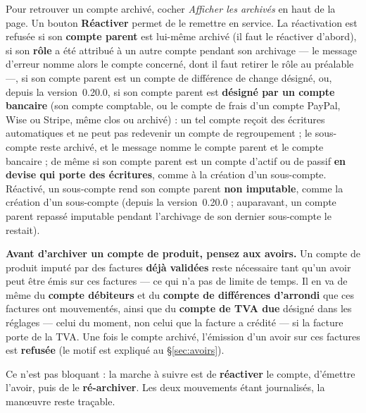 \documentclass[a4paper,11pt,oneside]{article}
\begin{document}
Pour retrouver un compte archivé, cocher \emph{Afficher les archivés} en haut de la page. Un bouton \textbf{Réactiver} permet de le remettre en service. La réactivation est refusée si son \textbf{compte parent} est lui-même archivé (il faut le réactiver d'abord), si son \textbf{rôle} a été attribué à un autre compte pendant son archivage — le message d'erreur nomme alors le compte concerné, dont il faut retirer le rôle au préalable —, si son compte parent est un compte de différence de change désigné, ou, depuis la version~0.20.0, si son compte parent est \textbf{désigné par un compte bancaire} (son compte comptable, ou le compte de frais d'un compte PayPal, Wise ou Stripe, même clos ou archivé) : un tel compte reçoit des écritures automatiques et ne peut pas redevenir un compte de regroupement ; le sous-compte reste archivé, et le message nomme le compte parent et le compte bancaire ; de même si son compte parent est un compte d'actif ou de passif \textbf{en devise qui porte des écritures}, comme à la création d'un sous-compte. Réactivé, un sous-compte rend son compte parent \textbf{non imputable}, comme la création d'un sous-compte (depuis la version~0.20.0 ; auparavant, un compte parent repassé imputable pendant l'archivage de son dernier sous-compte le restait).

\label{sec:plan-comptable-archivage}

\begin{keshwarning}
\textbf{Avant d'archiver un compte de produit, pensez aux avoirs.} Un compte de produit imputé par des factures \textbf{déjà validées} reste nécessaire tant qu'un avoir peut être émis sur ces factures — ce qui n'a pas de limite de temps. Il en va de même du \textbf{compte débiteurs} et du \textbf{compte de différences d'arrondi} que ces factures ont mouvementés, ainsi que du \textbf{compte de TVA due} désigné dans les réglages --- celui du moment, non celui que la facture a crédité --- si la facture porte de la TVA. Une fois le compte archivé, l'émission d'un avoir sur ces factures est \textbf{refusée} (le motif est expliqué au \S\ref{sec:avoirs}).

Ce n'est pas bloquant : la marche à suivre est de \textbf{réactiver} le compte, d'émettre l'avoir, puis de le \textbf{ré-archiver}. Les deux mouvements étant journalisés, la manœuvre reste traçable.
\end{keshwarning}
\end{document}
